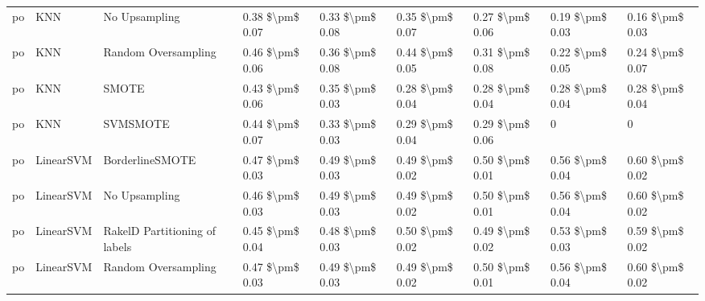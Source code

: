 \begin{tabular}{lllllllll}
      po &                             KNN &                 No Upsampling & 0.38 \$\textbackslash pm\$ 0.07 &           0.33 \$\textbackslash pm\$ 0.08 &       0.35 \$\textbackslash pm\$ 0.07 &        0.27 \$\textbackslash pm\$ 0.06 &                         0.19 \$\textbackslash pm\$ 0.03 &     0.16 \$\textbackslash pm\$ 0.03 \\
      po &                             KNN &           Random Oversampling & 0.46 \$\textbackslash pm\$ 0.06 &           0.36 \$\textbackslash pm\$ 0.08 &       0.44 \$\textbackslash pm\$ 0.05 &        0.31 \$\textbackslash pm\$ 0.08 &                         0.22 \$\textbackslash pm\$ 0.05 &     0.24 \$\textbackslash pm\$ 0.07 \\
      po &                             KNN &                         SMOTE & 0.43 \$\textbackslash pm\$ 0.06 &           0.35 \$\textbackslash pm\$ 0.03 &       0.28 \$\textbackslash pm\$ 0.04 &        0.28 \$\textbackslash pm\$ 0.04 &                         0.28 \$\textbackslash pm\$ 0.04 &     0.28 \$\textbackslash pm\$ 0.04 \\
      po &                             KNN &                      SVMSMOTE & 0.44 \$\textbackslash pm\$ 0.07 &           0.33 \$\textbackslash pm\$ 0.03 &       0.29 \$\textbackslash pm\$ 0.04 &        0.29 \$\textbackslash pm\$ 0.06 &                                       0 &                   0 \\
      po &                       LinearSVM &               BorderlineSMOTE & 0.47 \$\textbackslash pm\$ 0.03 &           0.49 \$\textbackslash pm\$ 0.03 &       0.49 \$\textbackslash pm\$ 0.02 &        0.50 \$\textbackslash pm\$ 0.01 &                         0.56 \$\textbackslash pm\$ 0.04 &     0.60 \$\textbackslash pm\$ 0.02 \\
      po &                       LinearSVM &                 No Upsampling & 0.46 \$\textbackslash pm\$ 0.03 &           0.49 \$\textbackslash pm\$ 0.03 &       0.49 \$\textbackslash pm\$ 0.02 &        0.50 \$\textbackslash pm\$ 0.01 &                         0.56 \$\textbackslash pm\$ 0.04 &     0.60 \$\textbackslash pm\$ 0.02 \\
      po &                       LinearSVM & RakelD Partitioning of labels & 0.45 \$\textbackslash pm\$ 0.04 &           0.48 \$\textbackslash pm\$ 0.03 &       0.50 \$\textbackslash pm\$ 0.02 &        0.49 \$\textbackslash pm\$ 0.02 &                         0.53 \$\textbackslash pm\$ 0.03 &     0.59 \$\textbackslash pm\$ 0.02 \\
      po &                       LinearSVM &           Random Oversampling & 0.47 \$\textbackslash pm\$ 0.03 &           0.49 \$\textbackslash pm\$ 0.03 &       0.49 \$\textbackslash pm\$ 0.02 &        0.50 \$\textbackslash pm\$ 0.01 &                         0.56 \$\textbackslash pm\$ 0.04 &     0.60 \$\textbackslash pm\$ 0.02 \\

\end{tabular}
